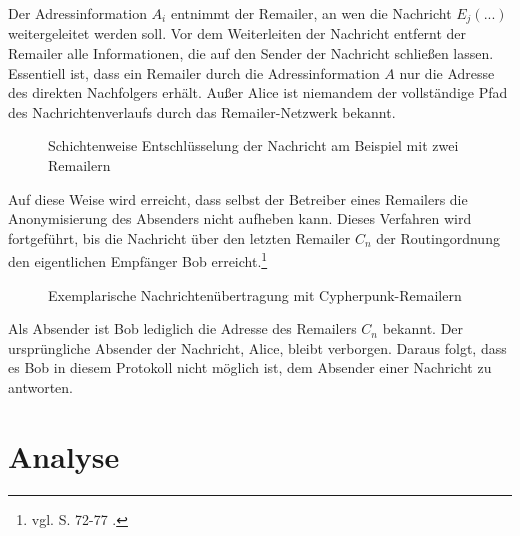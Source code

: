 Der Adressinformation \(A_i\) entnimmt der Remailer, an wen die Nachricht \(E_j(...)\) weitergeleitet werden soll. Vor dem Weiterleiten der Nachricht entfernt der Remailer alle Informationen, die auf den Sender der Nachricht schließen lassen. Essentiell ist, dass ein Remailer durch die Adressinformation \(A\) nur die Adresse des direkten Nachfolgers erhält. Außer Alice ist niemandem der vollständige Pfad des Nachrichtenverlaufs durch das Remailer-Netzwerk bekannt.

\begin{figure}
	\centering

	\caption{Schichtenweise Entschlüsselung der Nachricht am Beispiel mit zwei Remailern}
\end{figure}

Auf diese Weise wird erreicht, dass selbst der Betreiber eines Remailers die Anonymisierung des Absenders nicht aufheben kann. Dieses Verfahren wird fortgeführt, bis die Nachricht über den letzten Remailer \(C_n\) der Routingordnung den eigentlichen Empfänger Bob erreicht.\footnote{vgl. S. 72-77 \cite{kubieziel2007anonym}.}

\begin{figure}
	\begin{center}
		\def\svgwidth{0.8 \linewidth}
		
		\caption{Exemplarische Nachrichtenübertragung mit Cypherpunk-Remailern}
	\end{center}
\end{figure}

Als Absender ist Bob lediglich die Adresse des Remailers \(C_n\) bekannt. Der ursprüngliche Absender der Nachricht, Alice, bleibt verborgen. Daraus folgt, dass es Bob in diesem Protokoll nicht möglich ist, dem Absender einer Nachricht zu antworten.

\section{Analyse}
